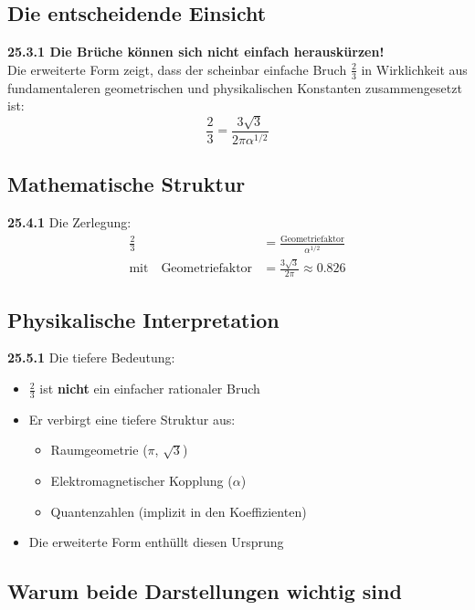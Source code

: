 \documentclass[12pt,a4paper]{article}
\begin{document}
\subsection{Die entscheidende Einsicht}

\begin{tcolorbox}[colback=red!5!white,colframe=red!75!black]
	\textbf{25.3.1 Die Brüche können sich nicht einfach herauskürzen!}
	\\
	Die erweiterte Form zeigt, dass der scheinbar einfache Bruch $\frac{2}{3}$ in Wirklichkeit aus fundamentaleren geometrischen und physikalischen Konstanten zusammengesetzt ist:
	\[
	\frac{2}{3} = \frac{3\sqrt{3}}{2\pi\alpha^{1/2}}
	\]
\end{tcolorbox}

\subsection{Mathematische Struktur}

\noindent \textbf{25.4.1} Die Zerlegung:
\begin{align*}
	\frac{2}{3} &= \frac{\text{Geometriefaktor}}{\alpha^{1/2}} \\
	\text{mit} \quad \text{Geometriefaktor} &= \frac{3\sqrt{3}}{2\pi} \approx 0.826
\end{align*}

\subsection{Physikalische Interpretation}

\noindent \textbf{25.5.1} Die tiefere Bedeutung:
\begin{itemize}
	\item $\frac{2}{3}$ ist \textbf{nicht} ein einfacher rationaler Bruch
	\item Er verbirgt eine tiefere Struktur aus:
	\begin{itemize}
		\item Raumgeometrie ($\pi$, $\sqrt{3}$)
		\item Elektromagnetischer Kopplung ($\alpha$)
		\item Quantenzahlen (implizit in den Koeffizienten)
	\end{itemize}
	\item Die erweiterte Form enthüllt diesen Ursprung
\end{itemize}

\subsection{Warum beide Darstellungen wichtig sind}
\end{document}
